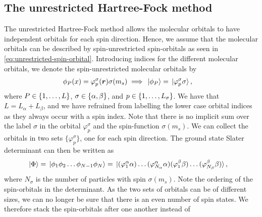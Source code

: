         \subsection{The unrestricted Hartree-Fock method}
            The unrestricted Hartree-Fock method allows the molecular orbitals
            to have independent orbitals for each spin direction.
            Hence, we assume that the molecular orbitals can be described by
            spin-unrestricted spin-orbitals as seen in
            \autoref{eq:unrestricted-spin-orbital}.
            Introducing indices for the different molecular orbitals, we denote
            the spin-unrestricted molecular orbitals by
            \begin{align}
                \phi_P(x)
                &=
                \varphi^{\sigma}_{p}(\boldsymbol{r})
                \sigma(m_s)
                \implies
                \ket*{\phi_P}
                = \ket*{\varphi^{\sigma}_{p}\sigma},
            \end{align}
            where $P \in \left\{ 1, \dots, L \right\}$, $\sigma \in \left\{ \alpha, \beta \right\}$,
            and $p \in \left\{ 1, \dots, L_{\sigma} \right\}$.
            We have that $L = L_{\alpha} + L_{\beta}$, and we have refrained
            from labelling the lower case orbital indices as they always occur
            with a spin index.
            Note that there is no implicit sum over the label $\sigma$ in the
            orbital $\varphi^{\sigma}_{p}$ and the spin-function $\sigma(m_s)$.
            We can collect the orbitals in two sets
            $\bigl\{\varphi^{\sigma}_{p}\bigr\}$, one for each spin direction.
            The ground state Slater determinant can then be written as
            \begin{align}
                \ket*{\Phi}
                &=
                \ket*{\phi_1 \phi_2 \dots \phi_{N - 1} \phi_N}
                =
                \ket*{
                    (\varphi^{\alpha}_{1}\alpha)
                    \dots
                    (\varphi^{\alpha}_{N_{\alpha}}\alpha)
                    (\varphi^{\beta}_{1}\beta)
                    \dots
                    (\varphi^{\beta}_{N_{\beta}}\beta)
                },
            \end{align}
            where $N_{\sigma}$ is the number of particles with spin
            $\sigma(m_s)$.
            Note the ordering of the spin-orbitals in the determinant.
            As the two sets of orbitals can be of different sizes, we can no
            longer be sure that there is an even number of spin states.
            We therefore stack the spin-orbitals after one another instead of

